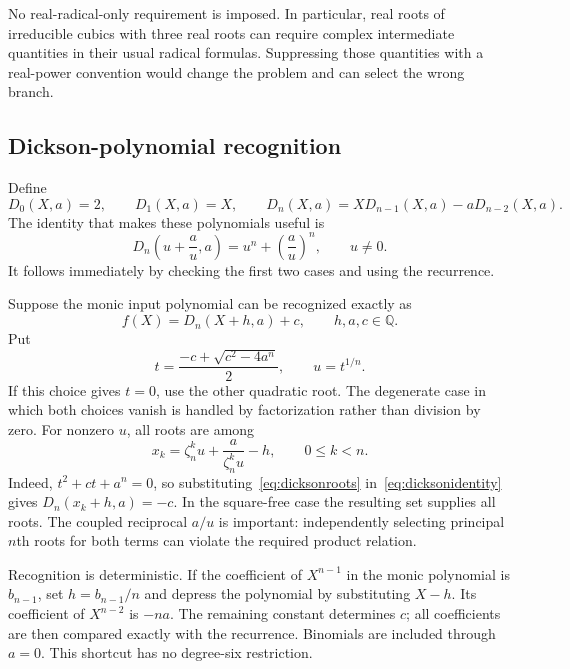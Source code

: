 \documentclass[11pt,a4paper]{article}
\newcommand{\Q}{\mathbb Q}
\theoremstyle{definition}
\theoremstyle{remark}
\begin{document}
No real-radical-only requirement is imposed. In particular, real roots of irreducible cubics with three real roots can require complex intermediate quantities in their usual radical formulas. Suppressing those quantities with a real-power convention would change the problem and can select the wrong branch.

\subsection{Dickson-polynomial recognition}

Define
\begin{equation}
 D_0(X,a)=2,\qquad D_1(X,a)=X,\qquad
 D_n(X,a)=X D_{n-1}(X,a)-aD_{n-2}(X,a).
 \label{eq:dicksonrec}
\end{equation}
The identity that makes these polynomials useful is
\begin{equation}
 D_n\left(u+\frac a u,a\right)=u^n+\left(\frac a u\right)^n,
 \qquad u\ne0.
 \label{eq:dicksonidentity}
\end{equation}
It follows immediately by checking the first two cases and using the recurrence.

Suppose the monic input polynomial can be recognized exactly as
\begin{equation}
 f(X)=D_n(X+h,a)+c,\qquad h,a,c\in\Q.
 \label{eq:dicksonrecognize}
\end{equation}
Put
\begin{equation}
 t=\frac{-c+\sqrt{c^2-4a^n}}2,\qquad u=t^{1/n}.
 \label{eq:dicksont}
\end{equation}
If this choice gives $t=0$, use the other quadratic root. The degenerate case in which both choices vanish is handled by factorization rather than division by zero. For nonzero $u$, all roots are among
\begin{equation}
 x_k=\zeta_n^k u+\frac{a}{\zeta_n^k u}-h,
 \qquad 0\le k<n.
 \label{eq:dicksonroots}
\end{equation}
Indeed, $t^2+ct+a^n=0$, so substituting~\eqref{eq:dicksonroots} in~\eqref{eq:dicksonidentity} gives $D_n(x_k+h,a)=-c$. In the square-free case the resulting set supplies all roots. The coupled reciprocal $a/u$ is important: independently selecting principal $n$th roots for both terms can violate the required product relation.

Recognition is deterministic. If the coefficient of $X^{n-1}$ in the monic polynomial is $b_{n-1}$, set $h=b_{n-1}/n$ and depress the polynomial by substituting $X-h$. Its coefficient of $X^{n-2}$ is $-na$. The remaining constant determines $c$; all coefficients are then compared exactly with the recurrence. Binomials are included through $a=0$. This shortcut has no degree-six restriction.
\end{document}
